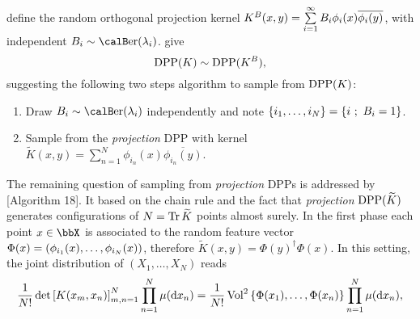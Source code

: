 \documentclass[twoside,11pt]{article}
\begin{document}
      define the random orthogonal projection kernel
      $
        K^B(x,y) 
          = \sum\limits_{i=1}^{\infty} B_i \phi_i(x) \overline{\phi_i(y)}
      $, with independent $B_i\sim\Ber(\lambda_i)$.
      \citet[Theorem 7]{HKPV06} give 
      \begin{equation}
        \operatorname{DPP}(K) \sim \operatorname{DPP}(K^B),
      \end{equation} 
      suggesting the following two steps algorithm to sample from $\operatorname{DPP}(K)$:
      \begin{enumerate}
        \item Draw $B_i\sim\Ber(\lambda_i)$ independently and note $\left\{ i_1,\dots,i_{N} \right\} = \left\{ i~;~B_i=1 \right\}$.
        \item Sample from the \textit{projection} DPP with kernel $\tilde{K}(x,y) = \sum_{n=1}^{N}\phi_{i_n}(x) \overline{\phi_{i_n}(y)}$.
      \end{enumerate}

      The remaining question of sampling from \textit{projection} DPPs is addressed by \citet{HKPV06}[Algorithm 18].
      It based on the chain rule and the fact that \textit{projection} $\operatorname{DPP}(\widetilde{K})$ generates configurations of $N=\operatorname{Tr} \widetilde{K}$ points almost surely.
      In the first phase each point $x\in \bbX$ is associated to the random feature vector $\Phi(x)=\left( \phi_{i_1}(x),\dots,\phi_{i_N}(x) \right)$, therefore $\tilde{K}(x,y) = \Phi(y)^{\dagger} \Phi(x)$.
      In this setting, the joint distribution of $(X_1,\dots,X_N)$ reads
      \begin{equation}
      \label{eq:joint_distribution}
        \frac{1}{N!} \det \left[ K(x_m,x_n) \right]_{m,n=1}^N \prod_{n=1}^N\mu(\mathop{}\!\mathrm{d} x_n)
          = \frac{1}{N!} \operatorname{Vol}^2\left\{ \Phi(x_1),\dots,\Phi(x_n) \right\} \prod_{n=1}^N\mu(\mathop{}\!\mathrm{d} x_n),
      \end{equation}
\end{document}
